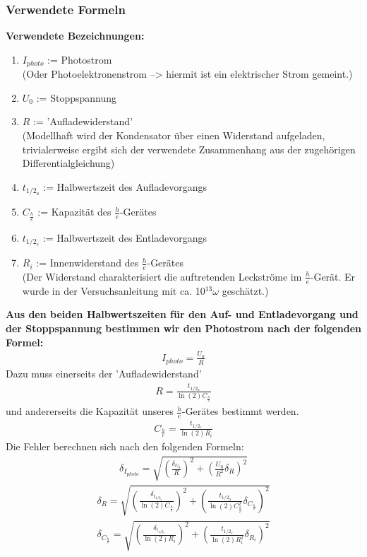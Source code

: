 \documentclass[12px]{scrartcl}
\begin{document}
\subsubsection{Verwendete Formeln}
\textbf{Verwendete Bezeichnungen:}
\begin{enumerate}
\item $I_{photo}$ := Photostrom\\
(Oder Photoelektronenstrom --> hiermit ist ein elektrischer Strom gemeint.)
\item $U_0$ := Stoppspannung
\item $R$ := 'Aufladewiderstand'\\
(Modellhaft wird der Kondensator über einen Widerstand aufgeladen, trivialerweise ergibt sich der verwendete Zusammenhang aus der zugehörigen Differentialgleichung)
\item $t_{1/2_a}$ := Halbwertszeit des Aufladevorgangs
\item $C_{\frac{h}{e}}$ := Kapazität des $\frac{h}{e}$-Gerätes
\item $t_{1/2_e}$ := Halbwertszeit des Entladevorgangs
\item $R_i$ := Innenwiderstand des $\frac{h}{e}$-Gerätes\\
(Der Widerstand charakterisiert die auftretenden Leckströme im $\frac{h}{e}$-Gerät. Er wurde in der Versuchsanleitung mit ca. 10$^{13}\omega$ geschätzt.)
\end{enumerate}
\textbf{Aus den beiden Halbwertszeiten für den Auf- und Entladevorgang und der Stoppspannung bestimmen wir den Photostrom nach der folgenden Formel:}
\begin{align}
I_{photo} = \frac{U_0}{R}
\label{eqn:i_ph}
\end{align}
Dazu muss einerseits der 'Aufladewiderstand'
\begin{align}
R = \frac{t_{1/2_a}}{\ln(2)C_{\frac{h}{e}}}
\label{eqn:R}
\end{align}
und andererseits die Kapazität unseres $\frac{h}{e}$-Gerätes bestimmt werden.
\begin{align}
C_{\frac{h}{e}} = \frac{t_{1/2_e}}{\ln(2)R_i}
\label{eqn:C}
\end{align}
Die Fehler berechnen sich nach den folgenden Formeln:
\begin{align}
\delta_{I_{photo}}= \sqrt{
\left(\frac{\delta_{U_0}}{R}\right)^2+
\left(\frac{U_0}{R^2}\delta_R\right)^2}
\label{eqn:i_ph_delta}
\end{align}
\begin{align}
\delta_{R}= \sqrt{
\left(\frac{\delta_{t_{1/2_a}}}{\ln(2)C_{\frac{h}{e}}}\right)^2+
\left(\frac{t_{1/2_a}}{\ln(2)C_{\frac{h}{e}}^2}\delta_{C_{\frac{h}{e}}}\right)^2}
\label{eqn:r_delta}
\end{align}
\begin{align}
\delta_{C_{\frac{h}{e}}}= \sqrt{
\left(\frac{\delta_{t_{1/2_e}}}{\ln(2)R_i}\right)^2+
\left(\frac{t_{1/2_e}}{\ln(2)R_i^2}\delta_{R_i}\right)^2}
\label{eqn:c_delta}
\end{align}
\end{document}
